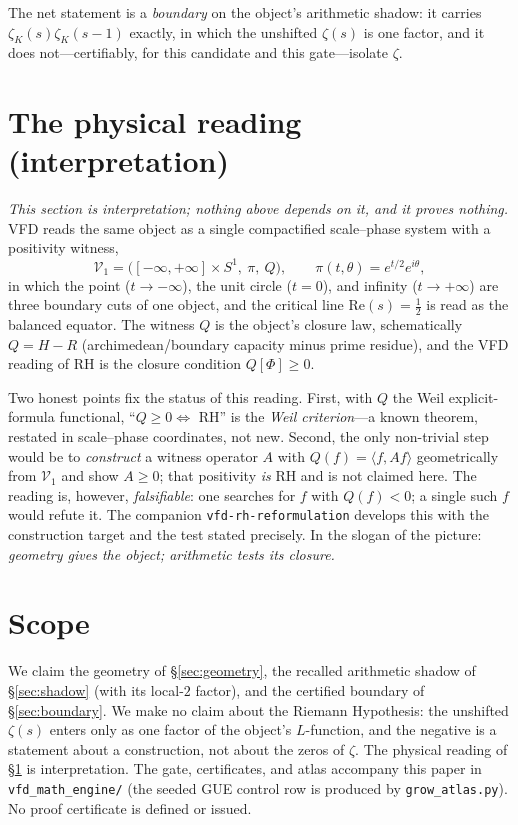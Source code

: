 \documentclass[11pt]{article}
\theoremstyle{definition}
\newcommand{\zetaK}{\zeta_{K}}
\begin{document}
The net statement is a \emph{boundary} on the object's arithmetic shadow: it carries
$\zetaK(s)\zetaK(s-1)$ exactly, in which the unshifted $\zeta(s)$ is one factor, and it
does not---certifiably, for this candidate and this gate---isolate $\zeta$.

\section{The physical reading (interpretation)}\label{sec:physics}
\emph{This section is interpretation; nothing above depends on it, and it proves nothing.}
VFD reads the same object as a single compactified scale--phase system with a positivity
witness,
\[
   \mathcal{V}_1=\bigl([-\infty,+\infty]\times S^1,\ \pi,\ Q\bigr),\qquad
   \pi(t,\theta)=e^{t/2}e^{i\theta},
\]
in which the point ($t\to-\infty$), the unit circle ($t=0$), and infinity
($t\to+\infty$) are three boundary cuts of one object, and the critical line
$\mathrm{Re}(s)=\tfrac12$ is read as the balanced equator. The witness $Q$ is the
object's closure law, schematically $Q=H-R$ (archimedean/boundary capacity minus prime
residue), and the VFD reading of RH is the closure condition $Q[\Phi]\ge0$.

Two honest points fix the status of this reading. First, with $Q$ the Weil
explicit-formula functional, ``$Q\ge0\iff$ RH'' is the \emph{Weil criterion}---a known
theorem, restated in scale--phase coordinates, not new. Second, the only non-trivial step
would be to \emph{construct} a witness operator $A$ with $Q(f)=\langle f,Af\rangle$
geometrically from $\mathcal{V}_1$ and show $A\ge0$; that positivity \emph{is} RH and is
not claimed here. The reading is, however, \emph{falsifiable}: one searches for $f$ with
$Q(f)<0$; a single such $f$ would refute it. The companion \texttt{vfd-rh-reformulation}
develops this with the construction target and the test stated precisely. In the slogan
of the picture: \emph{geometry gives the object; arithmetic tests its closure.}

\section{Scope}\label{sec:scope}
We claim the geometry of \S\ref{sec:geometry}, the recalled arithmetic shadow of
\S\ref{sec:shadow} (with its local-$2$ factor), and the certified boundary of
\S\ref{sec:boundary}. We make no claim about the Riemann Hypothesis: the unshifted
$\zeta(s)$ enters only as one factor of the object's $L$-function, and the negative is a
statement about a
construction, not about the zeros of $\zeta$. The physical reading of
\S\ref{sec:physics} is interpretation. The gate, certificates, and atlas accompany this
paper in \texttt{vfd\_math\_engine/} (the seeded GUE control row is produced by
\texttt{grow\_atlas.py}). No proof certificate is defined or issued.
\end{document}

